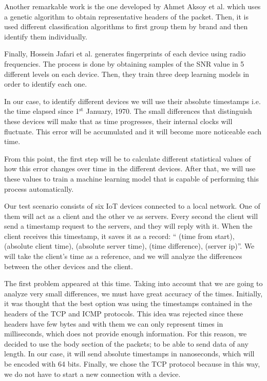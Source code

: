 Another remarkable work is the one developed by Ahmet Aksoy et al. \cite{aksoy2019automated} which uses a genetic algorithm to obtain representative headers of the packet. Then, it is used different classification algorithms to first group them by brand and then identify them individually. 


Finally, Hossein Jafari et al. \cite{jafari2018iot} generates fingerprints of each device using radio frequencies. The process is done by obtaining samples of the SNR value in 5 different levels on each device. Then, they train three deep learning models in order to identify each one.


In our case, to identify different devices we will use their absolute timestamps i.e. the time elapsed since 1$^\text{st}$ January, 1970. The small differences that distinguish these devices will make that as time progresses, their internal clocks will fluctuate. This error will be accumulated and it will become more noticeable each time.


From this point, the first step will be to calculate different statistical values of how this error changes over time in the different devices. After that, we will use these values to train a machine learning model that is capable of performing this process automatically.


Our test scenario consists of six IoT devices connected to a local network. One of them will act as a client and the other ve as servers. Every second the client will send a timestamp request to the servers, and they will reply with it. When the client receives this timestamp, it saves it as a record: “ (time from start), (absolute client time), (absolute server time), (time difference), (server ip)”. We will take the client's time as a reference, and we will analyze the differences between the other devices and the client.


The first problem appeared at this time. Taking into account that we are going to analyze very small differences, we must have great accuracy of the times. Initially, it was thought that the best option was using the timestamps contained in the headers of the TCP and ICMP protocols. This idea was rejected since these headers have few bytes and with them we can only represent times in milliseconds, which does not provide enough information. For this reason, we decided to use the body section of the packets; to be able to send data of any length. In our case, it will send absolute timestamps in nanoseconds, which will be encoded with 64 bits. Finally, we chose the TCP protocol because in this way, we do not have to start a new connection with a device. 


